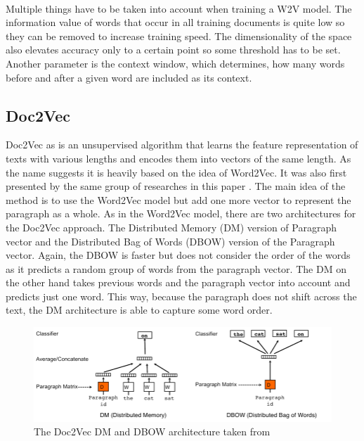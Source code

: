 \\
Multiple things have to be taken into account when training a W2V model. The information value of words that occur in all training documents is quite low so they can be removed to increase training speed. The dimensionality of the space also elevates accuracy only to a certain point so some threshold has to be set. Another parameter is the context window, which determines, how many words before and after a given word are included as its context.

\subsection{Doc2Vec}
Doc2Vec as is an unsupervised algorithm that learns the feature representation of texts with various lengths and encodes them into vectors of the same length. As the name suggests it is heavily based on the idea of Word2Vec. It was also first presented by the same group of researches in this paper \cite{DBLP:journals/corr/LeM14}. The main idea of the method is to use the Word2Vec model but add one more vector to represent the paragraph as a whole. As in the Word2Vec model, there are two architectures for the Doc2Vec approach. The Distributed Memory (DM) version of Paragraph vector and the Distributed Bag of Words (DBOW) version of the Paragraph vector. Again, the DBOW is faster but does not consider the order of the words as it predicts a random group of words from the paragraph vector. The DM on the other hand takes previous words and the paragraph vector into account and predicts just one word. This way, because the paragraph does not shift across the text, the DM architecture is able to capture some word order.
\begin{figure}[h]
    \centering
	\includegraphics[width=140mm]{./img/DV_DBOW_doc2vec_architectures.png}
	\caption{The Doc2Vec DM and DBOW architecture taken from \cite{DBLP:journals/corr/LeM14}}
	\label{fig:dbow_dm_d2v_architecture}
\end{figure}
